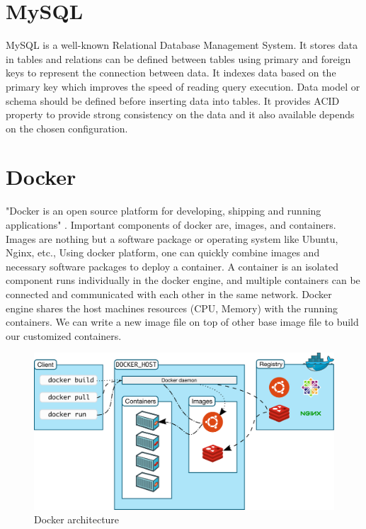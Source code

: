 	\section{MySQL}
	MySQL is a well-known Relational Database Management System. It stores data in tables and relations can be defined between tables using primary and foreign keys to represent the connection between data. It indexes data based on the primary key which improves the speed of reading query execution. Data model or schema should be defined before inserting data into tables. It provides ACID property to provide strong consistency on the data and it also available depends on the chosen configuration.
	
	\section{Docker}
	"Docker is an open source platform for developing, shipping and running applications" \cite{misc11}. Important components of docker are, images, and containers. Images are nothing but a software package or operating system like Ubuntu, Nginx, etc., Using docker platform, one can quickly combine images and necessary software packages to deploy a container. A container is an isolated component runs individually in the docker engine, and multiple containers can be connected and communicated with each other in the same network. Docker engine shares the host machines resources (CPU, Memory) with the running containers. We can write a new image file on top of other base image file to build our customized containers.
	
	\begin{figure}[!htbp] 
		\begin{center}
			\includegraphics[scale=0.07]{./images/png/docker_architecture}	
			\caption{Docker architecture \cite{misc14}}	
			\label{fig:docker_architecture}	
		\end{center}
	\end{figure}


